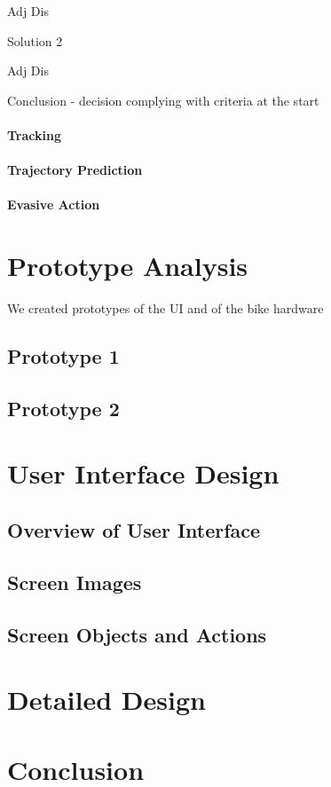 \documentclass[]{report}
\begin{document}
Adj 
Dis

Solution 2

Adj 
Dis

Conclusion - decision complying with criteria at the start

\subsubsection{Tracking}

\subsubsection{Trajectory Prediction}

\subsubsection{Evasive Action}

\chapter{Prototype Analysis}
We created prototypes of the UI and of the bike hardware 
\section{Prototype 1}

\section{Prototype 2}

\chapter{User Interface Design}
\section{Overview of User Interface}
\section{Screen Images}
\section{Screen Objects and Actions}

\chapter{Detailed Design}

\chapter{Conclusion}



\end{document}
